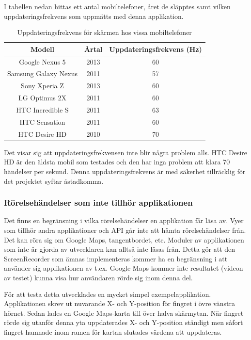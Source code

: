 I tabellen nedan hittas ett antal mobiltelefoner, året de släpptes samt vilken uppdateringsfrekvens som uppmätts med denna applikation.
\begin{table}[h!]
	\begin{center}
	\begin{tabular}{| c | c | c |}
		\hline
		Modell & Årtal & Uppdateringsfrekvens (Hz) \\
		\hline
		Google Nexus 5 & 2013 & 60 \\
    Samsung Galaxy Nexus & 2011 & 57 \\
		Sony Xperia Z & 2013 & 60 \\
		LG Optimus 2X & 2011 & 60 \\
		HTC Incredible S & 2011 & 63 \\
		HTC Sensation & 2011 & 60 \\
		HTC Desire HD & 2010 & 70 \\
		\hline
	\end{tabular}
	\end{center}
	\caption{Uppdateringsfrekvens för skärmen hos vissa mobiltelefoner}
	\label{tab:freq}
\end{table}

Det visar sig att uppdateringsfrekvensen inte blir några problem alls. HTC Desire HD är den äldsta mobil som testades och den har inga problem att klara 70 händelser per sekund. Denna uppdateringsfrekvens är med säkerhet tillräcklig för det projektet syftar åstadkomma.

\subsubsection{Rörelsehändelser som inte tillhör applikationen}
\label{toucheventsoutofapi}
Det finns en begränsning i vilka rörelsehändelser en applikation får läsa av. Vyer som tillhör andra applikationer och API går inte att hämta rörelsehändelser från. Det kan röra sig om Google Maps, tangentbordet, etc. Moduler av applikationen som inte är gjorda av utvecklaren kan alltså inte läsas från. Detta gör att den ScreenRecorder som ämnas implementeras kommer ha en begränsning i att använder sig applikationen av t.ex. Google Maps kommer inte resultatet (videon av testet) kunna visa hur användaren rörde sig inom denna del.

För att testa detta utvecklades en mycket simpel exempelapplikation. Applikationen skrev ut nuvarande X- och Y-position för fingret i övre vänstra hörnet. Sedan lades en Google Maps-karta till över halva skärmytan. När fingret rörde sig utanför denna yta uppdaterades X- och Y-position ständigt men såfort fingret hamnade inom ramen för kartan slutades värdena att uppdateras.

